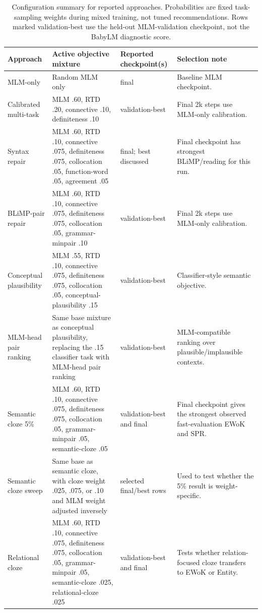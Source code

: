 \begin{table}[t]
\centering
\scriptsize
\setlength{\tabcolsep}{3pt}
\begin{tabularx}{\textwidth}{p{}p{}p{}X}
\toprule
\textbf{Approach} & \textbf{Active objective mixture} & \textbf{Reported checkpoint(s)} & \textbf{Selection note} \\
\midrule
MLM-only & Random MLM only & final & Baseline MLM checkpoint. \\
Calibrated multi-task & MLM .60, RTD .20, connective .10, definiteness .10 & validation-best & Final 2k steps use MLM-only calibration. \\
Syntax repair & MLM .60, RTD .10, connective .075, definiteness .075, collocation .05, function-word .05, agreement .05 & final; best discussed & Final checkpoint has strongest BLiMP/reading for this run. \\
BLiMP-pair repair & MLM .60, RTD .10, connective .075, definiteness .075, collocation .05, grammar-minpair .10 & validation-best & Final 2k steps use MLM-only calibration. \\
Conceptual plausibility & MLM .55, RTD .10, connective .075, definiteness .075, collocation .05, conceptual-plausibility .15 & validation-best & Classifier-style semantic objective. \\
MLM-head pair ranking & Same base mixture as conceptual plausibility, replacing the .15 classifier task with MLM-head pair ranking & validation-best & MLM-compatible ranking over plausible/implausible contexts. \\
Semantic cloze 5\% & MLM .60, RTD .10, connective .075, definiteness .075, collocation .05, grammar-minpair .05, semantic-cloze .05 & validation-best and final & Final checkpoint gives the strongest observed fast-evaluation EWoK and SPR. \\
Semantic cloze sweep & Same base as semantic cloze, with cloze weight .025, .075, or .10 and MLM weight adjusted inversely & selected final/best rows & Used to test whether the 5\% result is weight-specific. \\
Relational cloze & MLM .60, RTD .10, connective .075, definiteness .075, collocation .05, grammar-minpair .05, semantic-cloze .025, relational-cloze .025 & validation-best and final & Tests whether relation-focused cloze transfers to EWoK or Entity. \\
\bottomrule
\end{tabularx}
\caption{Configuration summary for reported approaches. Probabilities are fixed task-sampling weights during mixed training, not tuned recommendations. Rows marked validation-best use the held-out MLM-validation checkpoint, not the BabyLM diagnostic score.}
\label{tab:system-configs}
\end{table}
